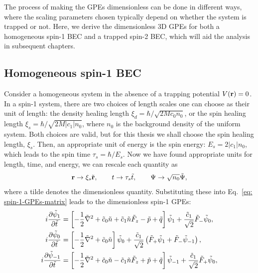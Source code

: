 The process of making the GPEs dimensionless can be done in different ways,
where the scaling parameters chosen typically depend on whether the system is
trapped or not.
Here, we derive the dimensionless 3D GPEs for both a homogeneous spin-1 BEC and
a trapped spin-2 BEC, which will aid the analysis in subsequent chapters.

\subsection{Homogeneous spin-1 BEC}
Consider a homogeneous system in the absence of a trapping potential
\(V(\vb{r}) = 0\).
In a spin-1 system, there are two choices of length scales one
can choose as their unit of length: the density healing length
\(\xi_d=\hbar /\sqrt{2Mc_0n_0}\), or the spin healing length
\(\xi_s = \hbar /\sqrt{2M|c_1|n_0}\), where \(n_0\) is the background density
of the uniform system.
Both choices are valid, but for this thesis we shall choose the spin healing
length, \(\xi_s\).
Then, an appropriate unit of energy is the spin energy: \(E_s = 2|c_1|n_0\),
which leads to the spin time \(\tau_s = \hbar / E_s\).
Now we have found appropriate units for length, time, and energy, we can
rescale each quantity as
\begin{align}
    \vb{r} \rightarrow \xi_s \tilde{\vb{r}}, \qquad
    t \rightarrow \tau_s\tilde{t}, \qquad
    \Psi \rightarrow \sqrt{n_0}\tilde{\Psi},
\end{align}
where a tilde denotes the dimensionless quantity.
Substituting these into Eq.~\eqref{eq: spin-1-GPEs-matrix} leads to the
dimensionless spin-1 GPEs:
\begin{align}
    i \pdv{\tilde{\psi}_{1}}{\tilde{t}} &= \left[-\frac{1}{2}\tilde{\nabla}^2
    + \tilde{c}_0\tilde{n} + \tilde{c}_1\tilde{n}\tilde{F}_z - \tilde{p}
    + \tilde{q}\right]\tilde{\psi}_{1}
    + \frac{\tilde{c}_1}{\sqrt{2}}\tilde{F}_-\tilde{\psi}_0, \\
    i \pdv{\tilde{\psi}_0}{\tilde{t}} &= \left[-\frac{1}{2}\tilde{\nabla}^2
    + \tilde{c}_0\tilde{n}\right]\tilde{\psi}_0
    + \frac{\tilde{c}_1}{\sqrt{2}}\left(\tilde{F}_+\tilde{\psi}_1
    + \tilde{F}_-\tilde{\psi}_{-1}\right), \\
    i \pdv{\tilde{\psi}_{-1}}{\tilde{t}} &= \left[-\frac{1}{2}\tilde{\nabla}^2
    + \tilde{c}_0\tilde{n} - \tilde{c}_1\tilde{n}\tilde{F}_z + \tilde{p}
    + \tilde{q}\right]\tilde{\psi}_{-1}
    + \frac{\tilde{c}_1}{\sqrt{2}}\tilde{F}_+\tilde{\psi}_0, \\
\end{align}
